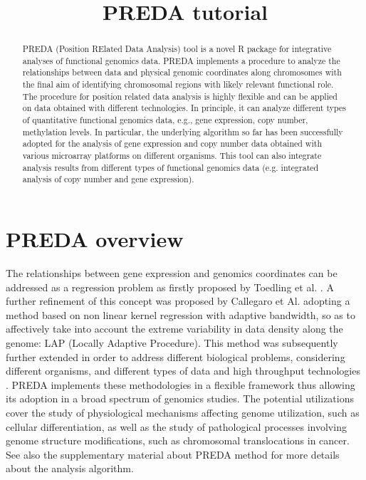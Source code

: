 \documentclass[a4paper,10pt]{article}
\title{PREDA tutorial}
\begin{document}
\maketitle

\begin{abstract}

PREDA (Position RElated Data Analysis) tool is a novel R package for integrative analyses of functional genomics data. PREDA implements a procedure to analyze the relationships between data and physical genomic coordinates along chromosomes with the final aim of identifying chromosomal regions with likely relevant functional role.
The procedure for position related data analysis is highly flexible and can be applied on data obtained with different technologies. In principle, it can analyze different types of quantitative functional genomics data, e.g., gene expression, copy number, methylation levels. In particular, the underlying algorithm so far has been successfully adopted for the analysis of gene expression and copy number data obtained with various microarray platforms on different organisms. This tool can also integrate analysis results from different types of functional genomics data (e.g. integrated analysis of copy number and gene expression).

\end{abstract} 

\newpage

\tableofcontents

\newpage


\section{PREDA overview}

The relationships between gene expression and genomics coordinates can be addressed as a regression problem as firstly proposed by Toedling et al. \cite{PubMed_15572464}. A further refinement of this concept was proposed by Callegaro et Al. \cite{PubMed_16951291} adopting a method based on non linear kernel regression with adaptive bandwidth, so as to affectively take into account the extreme variability in data density along the genome: LAP (Locally Adaptive Procedure). This method was subsequently further extended in order to address different biological problems, considering different organisms, and different types of data and high throughput technologies \cite{PubMed_17683550,PubMed_18039355,PubMed_19542187,PubMed_19059999,PubMed_19615122}.
PREDA implements these methodologies in a flexible framework thus allowing its adoption in a broad spectrum of genomics studies. The potential utilizations cover the study of physiological mechanisms affecting genome utilization, such as cellular differentiation, as well as the study of pathological processes involving genome structure modifications, such as chromosomal translocations in cancer. See also the supplementary material about PREDA method for more details about the analysis algorithm.
\end{document}

